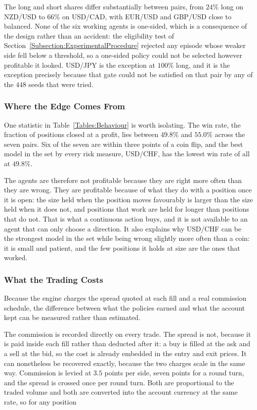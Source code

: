The long and short shares differ substantially between pairs, from $24\%$ long on NZD/USD to $66\%$ on USD/CAD, with EUR/USD and GBP/USD close to balanced. None of the six working agents is one-sided, which is a consequence of the design rather than an accident: the eligibility test of Section~\ref{Subsection:ExperimentalProcedure} rejected any episode whose weaker side fell below a threshold, so a one-sided policy could not be selected however profitable it looked. USD/JPY is the exception at $100\%$ long, and it is the exception precisely because that gate could not be satisfied on that pair by any of the $448$ seeds that were tried.

\subsubsection{Where the Edge Comes From}

One statistic in Table~\ref{Tables:Behaviour} is worth isolating. The win rate, the fraction of positions closed at a profit, lies between $49.8\%$ and $55.0\%$ across the seven pairs. Six of the seven are within three points of a coin flip, and the best model in the set by every risk measure, USD/CHF, has the lowest win rate of all at $49.8\%$.

The agents are therefore not profitable because they are right more often than they are wrong. They are profitable because of what they do with a position once it is open: the size held when the position moves favourably is larger than the size held when it does not, and positions that work are held for longer than positions that do not. That is what a continuous action buys, and it is not available to an agent that can only choose a direction. It also explains why USD/CHF can be the strongest model in the set while being wrong slightly more often than a coin: it is small and patient, and the few positions it holds at size are the ones that worked.

\subsubsection{What the Trading Costs}

Because the engine charges the spread quoted at each fill and a real commission schedule, the difference between what the policies earned and what the account kept can be measured rather than estimated.

The commission is recorded directly on every trade. The spread is not, because it is paid inside each fill rather than deducted after it: a buy is filled at the ask and a sell at the bid, so the cost is already embedded in the entry and exit prices. It can nonetheless be recovered exactly, because the two charges scale in the same way. Commission is levied at $3.5$ points per side, seven points for a round turn, and the spread is crossed once per round turn. Both are proportional to the traded volume and both are converted into the account currency at the same rate, so for any position

